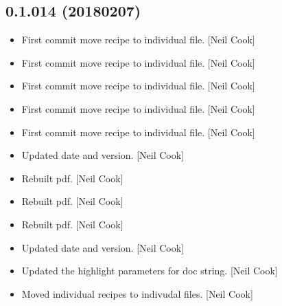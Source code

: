 \documentclass[a4paper,10pt,english]{report}
\begin{document}
\subsection{0.1.014 (2018\sphinxhyphen{}02\sphinxhyphen{}07)}
\label{\detokenize{misc/changelog:id509}}\begin{itemize}
\item {} 
First commit \sphinxhyphen{} move recipe to individual file. {[}Neil Cook{]}

\item {} 
First commit \sphinxhyphen{} move recipe to individual file. {[}Neil Cook{]}

\item {} 
First commit \sphinxhyphen{} move recipe to individual file. {[}Neil Cook{]}

\item {} 
First commit \sphinxhyphen{} move recipe to individual file. {[}Neil Cook{]}

\item {} 
First commit \sphinxhyphen{} move recipe to individual file. {[}Neil Cook{]}

\item {} 
Updated date and version. {[}Neil Cook{]}

\item {} 
Rebuilt pdf. {[}Neil Cook{]}

\item {} 
Rebuilt pdf. {[}Neil Cook{]}

\item {} 
Rebuilt pdf. {[}Neil Cook{]}

\item {} 
Updated date and version. {[}Neil Cook{]}

\item {} 
Updated the highlight parameters for doc string. {[}Neil Cook{]}

\item {} 
Moved individual recipes to indivudal files. {[}Neil Cook{]}

\end{itemize}
\end{document}
